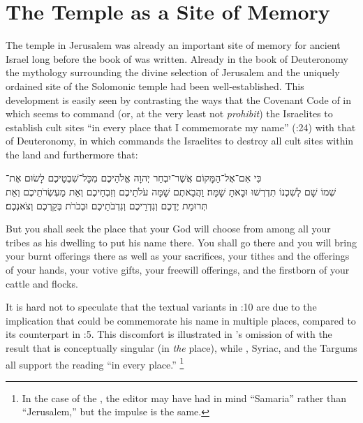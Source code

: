 
\section{The Temple as a Site of Memory}
The temple in Jerusalem was already an important site of memory for ancient Israel long before the book of \chronicles was written. Already in the book of Deuteronomy the mythology surrounding the divine selection of Jerusalem and the uniquely ordained site of the Solomonic temple had been well-established. This development is easily seen by contrasting the ways that the Covenant Code of  in which \yahweh seems to command (or, at the very least not \emph{prohibit}) the Israelites to establish cult sites  ``in every place that I commemorate my name'' (:24) with that of Deuteronomy, in which \yahweh commands the Israelites to destroy all cult sites within the land and furthermore that: 
\begin{hebrewtext}
    כִּי אִם־אֶל־הַמָּקוֹם אֲשֶׁר־יִבְחַר יְהוָה אֱלֹהֵיכֶם מִכָּל־שִׁבְטֵיכֶם לָשׂוּם אֶת־\\שְׁמוֹ שָׁם לְשִׁכְנוֹ תִדְרְשׁוּ וּבָאתָ שָׁמָּה׃
    וַהֲבֵאתֶם שָׁמָּה עֹלֹתֵיכֶם וְזִבְחֵיכֶם וְאֵת מַעְשְׂרֹתֵיכֶם וְאֵת תְּרוּמַת יֶדְכֶם וְנִדְרֵיכֶם וְנִדְבֹתֵיכֶם וּבְכֹרֹת בְּקַרְכֶם וְצֹאנְכֶם׃
\end{hebrewtext}
\begin{translation}
    But you shall seek the place that \yahweh your God will choose from among all your tribes as his dwelling to put his name there. You shall go there
    and you will bring your burnt offerings there as well as your sacrifices, your tithes and the offerings of your hands, your votive gifts, your freewill offerings, and the firstborn of your cattle and flocks. 
\end{translation}
\noindent
It is hard not to speculate that the textual variants in :10 are due to the implication that \yahweh could be commemorate his name in multiple places, compared to its counterpart in :5. This discomfort is illustrated in  \sampent's omission of  with the result that  is conceptually singular (in \emph{the} place), while \lxx, Syriac, and the Targums all support the reading ``in every place.''%
    \footnote{In the case of the \sampent, the editor may have had in mind ``Samaria'' rather than ``Jerusalem,'' but the impulse is the same.}
